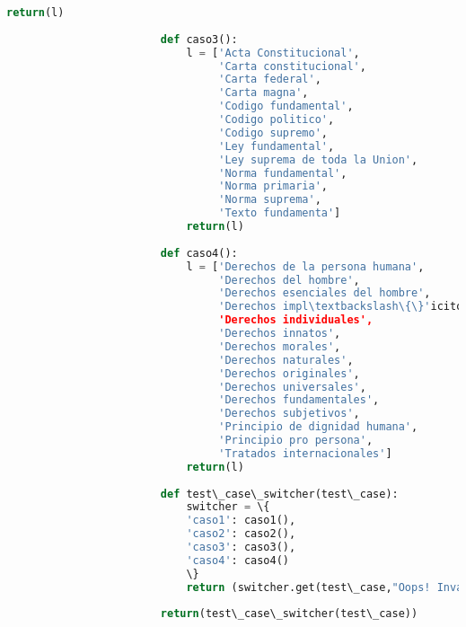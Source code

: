 \documentclass[12pt]{article}
\begin{document}
\begin{lstlisting}[language=Python, 
		caption= Clase loads,
		label={lst:claseLoads}]
							return(l)
				
				        def caso3():
				            l = ['Acta Constitucional',
				                 'Carta constitucional',
				                 'Carta federal',
				                 'Carta magna',
				                 'Codigo fundamental',
				                 'Codigo politico',
				                 'Codigo supremo',
				                 'Ley fundamental',
				                 'Ley suprema de toda la Union',
				                 'Norma fundamental',
				                 'Norma primaria',
				                 'Norma suprema',
				                 'Texto fundamenta']
				            return(l)
				
				        def caso4():
				            l = ['Derechos de la persona humana',
				                 'Derechos del hombre',
				                 'Derechos esenciales del hombre',
				                 'Derechos impl\textbackslash\{\}'icitos',
				                 'Derechos individuales',
				                 'Derechos innatos',
				                 'Derechos morales',
				                 'Derechos naturales',
				                 'Derechos originales',
				                 'Derechos universales',
				                 'Derechos fundamentales',
				                 'Derechos subjetivos',
				                 'Principio de dignidad humana',
				                 'Principio pro persona',
				                 'Tratados internacionales']
				            return(l)
				
				        def test\_case\_switcher(test\_case):
				            switcher = \{
				            'caso1': caso1(),
				            'caso2': caso2(),
				            'caso3': caso3(),
				            'caso4': caso4()
				            \}
				            return (switcher.get(test\_case,"Oops! Invalid Option"))
				        
				        return(test\_case\_switcher(test\_case))
	\end{lstlisting}		
	
\end{document}
